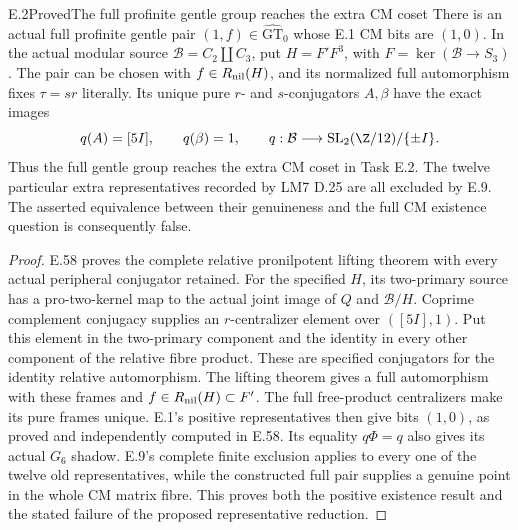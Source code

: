 \begin{statement}{E.2}{Proved}{The full profinite gentle group reaches the extra CM coset}
There is an actual full profinite gentle pair
$(1,f)\in\widehat{\mathrm{GT}}_0$ whose E.1 CM bits are $(1,0)$.
In the actual modular source $\mathcal B=C_2\amalg C_3$, put
$H=F'F^3$, with $F=\ker(\mathcal B\to S_3)$. The pair can be
chosen with $f\in R_{\rm nil}(H)$, and its normalized full
automorphism fixes $\tau=sr$ literally. Its unique pure
$r$- and $s$-conjugators $A,\beta$ have the exact images
\[
 q(A)=[5I],\qquad q(\beta)=1,
 \qquad q:\mathcal B\longrightarrow
      \operatorname{SL}_2(\Z/12)/\{\pm I\}.
\]
Thus the full gentle group reaches the extra CM coset in Task E.2.
The twelve particular extra representatives recorded by LM7 D.25
are all excluded by E.9. The asserted equivalence between their
genuineness and the full CM existence question is consequently false.
\end{statement}
\begin{proof}
E.58 proves the complete relative pronilpotent lifting theorem
with every actual peripheral conjugator retained. For the specified
$H$, its two-primary source has a pro-two-kernel map to the actual
joint image of $Q$ and $\mathcal B/H$. Coprime complement conjugacy
supplies an $r$-centralizer element over $([5I],1)$. Put this element
in the two-primary component and the identity in every other component
of the relative fibre product. These are specified conjugators for
the identity relative automorphism. The lifting theorem gives a full
automorphism with these frames and $f\in R_{\rm nil}(H)\subset F'$.
The full free-product centralizers make its pure frames unique.
E.1's positive representatives then give bits $(1,0)$, as proved
and independently computed in E.58. Its equality $q\Phi=q$
also gives its actual $G_6$ shadow. E.9's complete finite exclusion
applies to every one of the twelve old representatives, while the
constructed full pair supplies a genuine point in the whole CM
matrix fibre. This proves both the positive existence result and
the stated failure of the proposed representative reduction.
\end{proof}

